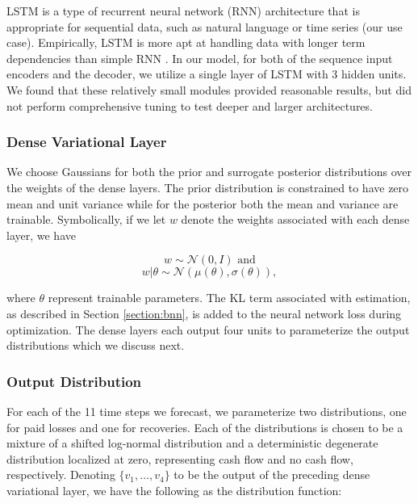 \documentclass{article}
\begin{document}
LSTM is a type of recurrent neural network (RNN) architecture that is appropriate for sequential data, such as natural language or time series (our use case). Empirically, LSTM is more apt at handling data with longer term dependencies than simple RNN \cite{lecun2015deep}. In our model, for both of the sequence input encoders and the decoder, we utilize a single layer of LSTM with 3 hidden units. We found that these relatively small modules provided reasonable results, but did not perform comprehensive tuning to test deeper and larger architectures. 

\subsubsection{Dense Variational Layer}

We choose Gaussians for both the prior and surrogate posterior distributions over the weights of the dense layers. The prior distribution is constrained to have zero mean and unit variance while for the posterior both the mean and variance are trainable. Symbolically, if we let $w$ denote the weights associated with each dense layer, we have

\begin{equation}
    w \sim \mathcal{N}(0, I) \text{ and}
\end{equation}
\begin{equation}
    w|\theta \sim \mathcal{N}(\mu(\theta), \sigma(\theta)),
\end{equation}

where $\theta$ represent trainable parameters. The KL term associated with estimation, as described in Section \ref{section:bnn}, is added to the neural network loss during optimization. The dense layers each output four units to parameterize the output distributions which we discuss next.

\subsubsection{Output Distribution}\label{section:outputdist}

For each of the 11 time steps we forecast, we parameterize two distributions, one for paid losses and one for recoveries. Each of the distributions is chosen to be a mixture of a shifted log-normal distribution and a deterministic degenerate distribution localized at zero, representing cash flow and no cash flow, respectively. Denoting $\{v_1,\dots,v_4\}$ to be the output of the preceding dense variational layer, we have the following as the distribution function:
\end{document}
